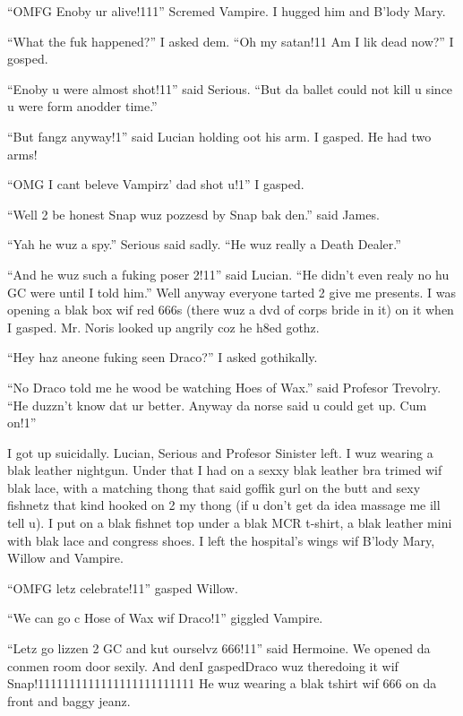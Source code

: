 \enquote{OMFG Enoby ur alive!111} Scremed Vampire. I hugged him and B'lody Mary.

\enquote{What the fuk happened?} I asked dem. \enquote{Oh my satan!11 Am I lik dead now?} I gosped.

\enquote{Enoby u were almost shot!11} said Serious. \enquote{But da ballet could not kill u since u were form anodder time.}

\enquote{But fangz anyway!1} said Lucian holding oot his arm. I gasped. He had two arms!

\enquote{OMG I cant beleve Vampirz' dad shot u!1} I gasped.

\enquote{Well 2 be honest Snap wuz pozzesd by Snap bak den.} said James.

\enquote{Yah he wuz a spy.} Serious said sadly. \enquote{He wuz really a Death Dealer.}

\enquote{And he wuz such a fuking poser 2!11} said Lucian. \enquote{He didn't even realy no hu GC were until I told him.} Well anyway everyone tarted 2 give me presents. I was opening a blak box wif red 666s (there wuz a dvd of corps bride in it) on it when I gasped. Mr. Noris looked up angrily coz he h8ed gothz.

\enquote{Hey haz aneone fuking seen Draco?} I asked gothikally.

\enquote{No Draco told me he wood be watching Hoes of Wax.} said Profesor Trevolry. \enquote{He duzzn't know dat ur better. Anyway da norse said u could get up. Cum on!1}

I got up suicidally. Lucian, Serious and Profesor Sinister left. I wuz wearing a blak leather nightgun. Under that I had on a sexxy blak leather bra trimed wif blak lace, with a matching thong that said goffik gurl on the butt and sexy fishnetz that kind hooked on 2 my thong (if u don't get da idea massage me ill tell u). I put on a blak fishnet top under a blak MCR t-shirt, a blak leather mini with blak lace and congress shoes. I left the hospital's wings wif B'lody Mary, Willow and Vampire.

\enquote{OMFG letz celebrate!11} gasped Willow.

\enquote{We can go c Hose of Wax wif Draco!1} giggled Vampire.

\enquote{Letz go lizzen 2 GC and kut ourselvz 666!11} said Hermoine. We opened da conmen room door sexily. And den\dotfill\newline I gasped\dotfill Draco wuz there\newline doing it wif Snap!1111111111111111111111111 He wuz wearing a blak tshirt wif 666 on da front and baggy jeanz.

